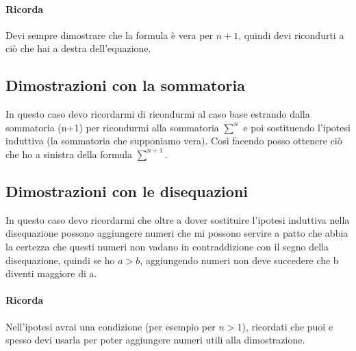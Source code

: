 \documentclass[12pt, a4paper, openany]{book}
\begin{document}
\paragraph*{Ricorda} Devi sempre dimostrare che la formula è vera per $n+1$, quindi devi ricondurti a
ciò che hai a destra dell'equazione.

\subsection*{Dimostrazioni con la sommatoria}
In questo caso devo ricordarmi di ricondurmi al caso base estrando dalla sommatoria (n+1)
per ricondurmi alla sommatoria $\sum^n$ e poi sostituendo l'ipotesi induttiva
(la sommatoria che supponiamo vera). Così facendo posso ottenere ciò che ho a sinistra della
formula $\sum^{n+1}$.
\subsection*{Dimostrazioni con le disequazioni}
In questo caso devo ricordarmi che oltre a dover sostituire l'ipotesi induttiva nella disequazione
possono aggiungere numeri che mi possono servire a patto che abbia la certezza che questi numeri non
vadano in contraddizione con il segno della disequazione, quindi se ho $a>b$, aggiungendo numeri non deve succedere
che b diventi maggiore di a.
\paragraph*{Ricorda} Nell'ipotesi avrai una condizione (per esempio per $n>1$), ricordati che puoi e spesso
devi usarla per poter aggiungere numeri utili alla dimostrazione.
\end{document}
